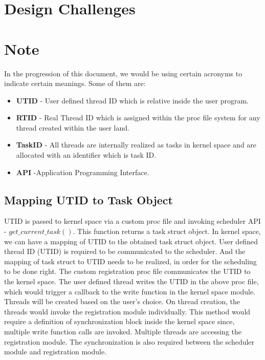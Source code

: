\section{Design Challenges}

\section*{Note}
In the progression of this document, we would be using certain acronyms to indicate certain meanings. 
Some of them are:
\begin{itemize}
\item \textbf{UTID} - User defined thread ID which is relative inside the user program. 
\item \textbf{RTID} - Real Thread ID which is assigned within the proc file system for any thread created within the user land. 
\item \textbf{TaskID} - All threads are internally realized as tasks in kernel space and are allocated with an identifier which is task ID.
\item \textbf{API} -Application Programming Interface.
\end{itemize}

\subsection{Mapping UTID to Task Object}

UTID  is passed to kernel space via a custom proc file and invoking scheduler API - $get\_current\_task()$. 
This function returns a task struct object. 
In kernel space, we can have a mapping of UTID to the obtained task struct object. 
User defined thread ID (UTID) is required to be communicated to the scheduler. 
And the mapping of task struct to UTID needs to be realized, in order for the scheduling to be done right. 
The custom registration proc file communicates the UTID to the kernel space. 
The user defined thread writes the UTID in the above proc file, which would trigger a callback to the write function in the kernel space module. 
Threads will be created based on the user's choice. 
On thread creation, the threads would invoke the registration module individually. 
This method would require a definition of synchronization block inside the kernel space since, multiple write function calls are invoked. 
Multiple threads are accessing the registration module. 
The synchronization is also required between the scheduler module and registration module.


